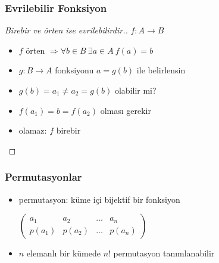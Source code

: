 \documentclass[dvipsnames]{beamer}
\theoremstyle{definition}
\theoremstyle{example}
\theoremstyle{plain}
\begin{document}
\begin{frame}
  \frametitle{Evrilebilir Fonksiyon}

  \begin{proof}[Birebir ve örten ise evrilebilirdir.]
    $f: A \rightarrow B$
    \begin{itemize}
      \item $f$ örten $\Rightarrow \forall b \in B~\exists a \in A~f(a)=b$
      \item $g: B \rightarrow A$ fonksiyonu $a=g(b)$ ile belirlensin

      \pause
      \medskip
      \item $g(b) = a_1 \neq a_2 = g(b)$ olabilir mi?

      \pause
      \item $f(a_1) = b = f(a_2)$ olması gerekir

      \pause
      \item olamaz: $f$ birebir
    \end{itemize}
  \end{proof}
\end{frame}

\begin{frame}
  \frametitle{Permutasyonlar}

  \begin{itemize}
    \item permutasyon: küme içi bijektif bir fonksiyon

    \medskip
    $\left(
      \begin{array}{cccc}
         a_1   &  a_2   & \dots &  a_n\\
        p(a_1) & p(a_2) & \dots & p(a_n)
      \end{array}
    \right)$

    \pause
    \medskip
    \item $n$ elemanlı bir kümede $n!$ permutasyon tanımlanabilir
  \end{itemize}
\end{frame}
\end{document}

